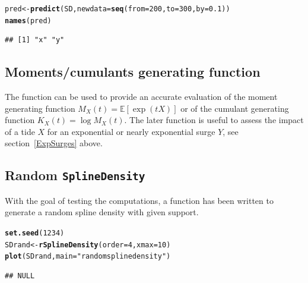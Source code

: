 \documentclass[11pt,a4paper]{report}\usepackage[]{graphicx}\usepackage[]{color}
\makeatletter
\newcommand{\hlnum}[1]{\textcolor[rgb]{0.686,0.059,0.569}{#1}}%
\newcommand{\hlstr}[1]{\textcolor[rgb]{0.192,0.494,0.8}{#1}}%
\newcommand{\hlstd}[1]{\textcolor[rgb]{0.345,0.345,0.345}{#1}}%
\newcommand{\hlkwb}[1]{\textcolor[rgb]{0.69,0.353,0.396}{#1}}%
\newcommand{\hlkwc}[1]{\textcolor[rgb]{0.333,0.667,0.333}{#1}}%
\newcommand{\hlkwd}[1]{\textcolor[rgb]{0.737,0.353,0.396}{\textbf{#1}}}%
\newenvironment{kframe}{%
 \def\at@end@of@kframe{}%
 \ifinner\ifhmode%
  \def\at@end@of@kframe{\end{minipage}}%
  \begin{minipage}{\columnwidth}%
 \fi\fi%
 \def\FrameCommand##1{\hskip\@totalleftmargin \hskip-\fboxsep
 \colorbox{shadecolor}{##1}\hskip-\fboxsep
     \hskip-\linewidth \hskip-\@totalleftmargin \hskip\columnwidth}%
 \MakeFramed {\advance\hsize-\width
   \@totalleftmargin\z@ \linewidth\hsize
   \@setminipage}}%
 {\par\unskip\endMakeFramed%
 \at@end@of@kframe}
\newenvironment{knitrout}{}{} %
\newcommand{\Esp}{\mathbb{E}}
\makeatother
\begin{document}
\begin{knitrout}
\color{fgcolor}\begin{kframe}
\begin{alltt}
\hlstd{pred} \hlkwb{<-} \hlkwd{predict}\hlstd{(SD,} \hlkwc{newdata} \hlstd{=} \hlkwd{seq}\hlstd{(}\hlkwc{from} \hlstd{=} \hlnum{200}\hlstd{,} \hlkwc{to} \hlstd{=} \hlnum{300}\hlstd{,} \hlkwc{by} \hlstd{=} \hlnum{0.1}\hlstd{))}
\hlkwd{names}\hlstd{(pred)}
\end{alltt}
\begin{verbatim}
## [1] "x" "y"
\end{verbatim}
\end{kframe}
\end{knitrout}

\subsection{Moments/cumulants generating function}
The \verb@momGen@ function can be used to provide an accurate
evaluation of the moment generating function $M_X(t) = \Esp[\exp(tX)]$ 
or of the cumulant generating function $K_X(t) = \log M_X(t)$. The
later function is useful to assess the impact of a tide $X$
for an exponential or nearly exponential surge $Y$, see section~\ref{ExpSurges} 
above.



\subsection{Random \texttt{SplineDensity}}
With the goal of testing the computations, a \verb@rSplineDensity@
function has been written to generate a random spline density with
given support. 

\begin{knitrout}
\color{fgcolor}\begin{kframe}
\begin{alltt}
\hlkwd{set.seed}\hlstd{(}\hlnum{1234}\hlstd{)}
\hlstd{SDrand} \hlkwb{<-} \hlkwd{rSplineDensity}\hlstd{(}\hlkwc{order} \hlstd{=} \hlnum{4}\hlstd{,} \hlkwc{xmax} \hlstd{=} \hlnum{10}\hlstd{)}
\hlkwd{plot}\hlstd{(SDrand,} \hlkwc{main} \hlstd{=} \hlstr{"random spline density"}\hlstd{)}
\end{alltt}
\begin{verbatim}
## NULL
\end{verbatim}
\end{kframe}
\end{knitrout}
\end{document}
